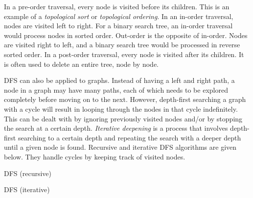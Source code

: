 In a pre-order traversal, every node is visited before its children. This is an example of a \textit{topological sort} or \textit{topological ordering}. In an in-order traversal, nodes are visited left to right. For a binary search tree, an in-order traversal would process nodes in sorted order. Out-order is the opposite of in-order. Nodes are visited right to left, and a binary search tree would be processed in reverse sorted order. In a post-order traversal, every node is visited after its children. It is often used to delete an entire tree, node by node.

DFS can also be applied to graphs. Instead of having a left and right path, a node in a graph may have many paths, each of which needs to be explored completely before moving on to the next. However, depth-first searching a graph with a cycle will result in looping through the nodes in that cycle indefinitely. This can be dealt with by ignoring previously visited nodes and/or by stopping the search at a certain depth. \textit{Iterative deepening} is a process that involves depth-first searching to a certain depth and repeating the search with a deeper depth until a given node is found. Recursive and iterative DFS algorithms are given below. They handle cycles by keeping track of visited nodes.

\vspace{4mm}
\begin{algorithm}[H]
    \caption{DFS (recursive)}
\end{algorithm}

\vspace{4mm}
\begin{algorithm}[H]
    \caption{DFS (iterative)}
\end{algorithm}
\vspace{5mm}

